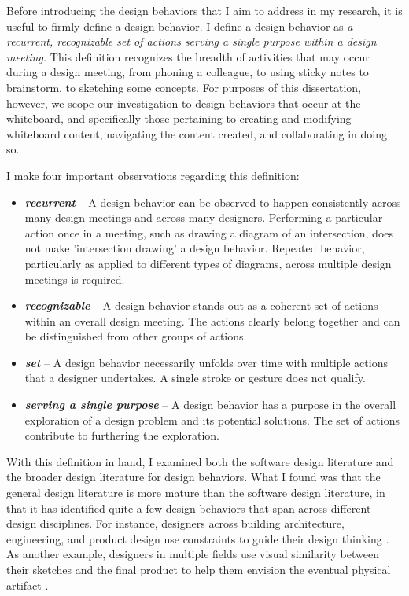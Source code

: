 \documentclass[12pt,fleqn]{ucithesis}
\begin{document}
Before introducing the design behaviors that I aim to address in my research, it is useful to firmly define a design behavior. I define a design behavior as \emph{a recurrent, recognizable set of actions serving a single purpose within a design meeting.} This definition recognizes the breadth of activities that may occur during a design meeting, from phoning a colleague, to using sticky notes to brainstorm, to sketching some concepts.  For purposes of this dissertation, however, we scope our investigation to design behaviors that occur at the whiteboard, and specifically those pertaining to creating and modifying whiteboard content, navigating the content created, and collaborating in doing so.

I make four important observations regarding this definition:

\begin{itemize}
\item \textbf{\emph{recurrent}} -- A design behavior can be observed to happen consistently across many design meetings and across many designers. Performing a particular action once in a meeting, such as drawing a diagram of an intersection, does not make 'intersection drawing' a design behavior.  Repeated behavior, particularly as applied to different types of diagrams, across multiple design meetings is required. 
\item \textbf{\emph{recognizable}} -- A design behavior stands out as a coherent set of actions within an overall design meeting. The actions clearly belong together and can be distinguished from other groups of actions.
\item \textbf{\emph{set}} -- A design behavior necessarily unfolds over time with multiple actions that a designer undertakes. A single stroke or gesture does not qualify. 
\item \textbf{\emph{serving a single purpose}} -- A design behavior has a purpose in the overall exploration of a design problem and its potential solutions. The set of actions contribute to furthering the exploration.  
\end{itemize}

With this definition in hand, I examined both the software design literature and the broader design literature for design behaviors. What I found was that the general design literature is more mature than the software design literature, in that it has identified quite a few design behaviors that span across different design disciplines. For instance, designers across building architecture, engineering, and product design use constraints to guide their design thinking \cite{cross2007designerly}. As another example, designers in multiple fields use visual similarity between their sketches and the final product to help them envision the eventual physical artifact \cite{do1998right}.
\end{document}
